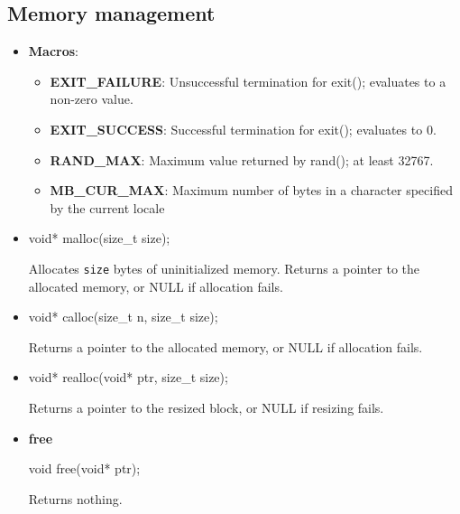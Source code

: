 \documentclass{report}
\begin{document}
    \subsection{Memory management}
    \begin{itemize}
        \item \textbf{Macros}: 
            \begin{itemize}
                \item \textbf{EXIT\_FAILURE}: Unsuccessful termination for exit(); evaluates to a non-zero value.
                \item \textbf{EXIT\_SUCCESS}: Successful termination for exit(); evaluates to 0.
                \item \textbf{RAND\_MAX}:  Maximum value returned by rand(); at least 32767.
                \item \textbf{MB\_CUR\_MAX}: Maximum number of bytes in a character specified by the current locale
            \end{itemize}
        \item 
            \bigbreak \noindent 
            \begin{cppcode}
                void* malloc(size_t size);
            \end{cppcode}
            \bigbreak \noindent 
            Allocates \texttt{size} bytes of uninitialized memory.
            \bigbreak \noindent 
            Returns a pointer to the allocated memory, or NULL if allocation fails.
        \item 
            \bigbreak \noindent 
            \begin{cppcode}
                void* calloc(size_t n, size_t size);
            \end{cppcode}
            \bigbreak \noindent 
            Returns a pointer to the allocated memory, or NULL if allocation fails.
        \item 
            \bigbreak \noindent 
            \begin{cppcode}
            void* realloc(void* ptr, size_t size);
            \end{cppcode}
            \bigbreak \noindent 
            Returns a pointer to the resized block, or NULL if resizing fails.
        \item \textbf{free}
            \bigbreak \noindent 
            \begin{cppcode}
            void free(void* ptr);
            \end{cppcode}
            \bigbreak \noindent 
            Returns nothing.


    \end{itemize}
\end{document}
